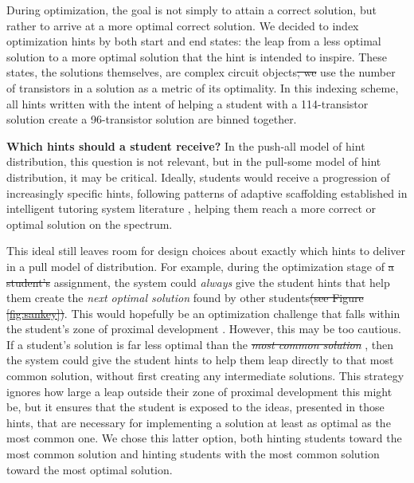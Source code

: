 \documentclass[12pt,twoside]{mitthesis}
\providecommand{\DIFaddtex}[1]{{\protect\color{blue}\uwave{#1}}} %
\providecommand{\DIFdeltex}[1]{{\protect\color{red}\sout{#1}}}                      %
\providecommand{\DIFaddbegin}{} %
\providecommand{\DIFaddend}{} %
\providecommand{\DIFdelbegin}{} %
\providecommand{\DIFdelend}{} %
\providecommand{\DIFadd}[1]{\texorpdfstring{\DIFaddtex{#1}}{#1}} %
\providecommand{\DIFdel}[1]{\texorpdfstring{\DIFdeltex{#1}}{}} %
\begin{document}
During optimization, the goal is not simply to attain a correct solution, but rather to arrive at a more optimal correct solution. We decided to index optimization hints by both start and end states: the leap from a less optimal solution to a more optimal solution that the hint is intended to inspire. These states, the solutions themselves, are complex circuit objects\DIFdelbegin \DIFdel{; we }\DIFdelend \DIFaddbegin \DIFadd{. We }\DIFaddend use the number of transistors in a solution as a metric of its optimality. In this indexing scheme, all hints written with the intent of helping a student with a 114-transistor solution create a 96-transistor solution are binned together.

{\DIFdelbegin %
\DIFdelend \DIFaddbegin \bf \DIFaddend Which hints should a student receive?} In the push-all model of hint distribution, this question is not relevant, but in the pull-some model of hint distribution, it may be critical. Ideally, students would receive a progression of increasingly specific hints, following patterns of adaptive scaffolding established in intelligent tutoring system literature \cite{andes}, helping them reach a more correct or optimal solution on the spectrum. 

This ideal still leaves room for design choices about exactly which hints to deliver in a pull model of distribution. For example, during the optimization stage of \DIFdelbegin \DIFdel{a student's }\DIFdelend \DIFaddbegin \DIFadd{an }\DIFaddend assignment, the system could \textit{always} give the student hints that help them create the \textit{next optimal solution} found by other students\DIFdelbegin \DIFdel{(see Figure \ref{fig:sankey})}\DIFdelend . This would hopefully be an optimization challenge that falls within the student's zone of proximal development \cite{ZMP}. However, this may be too cautious. If a student's solution is far less optimal than the \DIFdelbegin \textit{\DIFdel{most common solution}}%
\DIFdelend \DIFaddbegin \DIFadd{most common solution}\DIFaddend , then the system could give the student hints to help them leap directly to that most common solution, without first creating any intermediate solutions. This strategy ignores how large a leap outside their zone of proximal development this might be, but it ensures that the student is exposed to the ideas, presented in those hints, that are necessary for implementing a solution at least as optimal as the most common one. We chose this latter option, both hinting students toward the most common solution and hinting students with the most common solution toward the most optimal solution.
\end{document}
